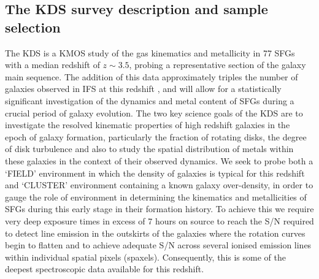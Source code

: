 \documentclass[fleqn,usenatbib]{mn2e}
\begin{document}
\subsection{The KDS survey description and sample selection}\label{subsec:survey_intro}
The KDS is a KMOS study of the gas kinematics and metallicity in 77 SFGs with a median redshift of $z\sim3.5$, probing a representative section of the galaxy main sequence.
The addition of this data approximately triples the number of galaxies observed in IFS at this redshift \citep{Cresci2010,Lemoine-Busserolle2010,Gnerucci2011}, and will allow for a statistically significant investigation of the dynamics and metal content of SFGs during a crucial period of galaxy evolution. 
The two key science goals of the KDS are to investigate the resolved kinematic properties of high redshift galaxies in the epoch of galaxy formation, particularly the fraction of rotating disks, the degree of disk turbulence and also to study the spatial distribution of metals within these galaxies in the context of their observed dynamics.
We seek to probe both a `FIELD' environment in which the density of galaxies is typical for this redshift and `CLUSTER' environment containing a known galaxy over-density, in order to gauge the role of environment in determining the kinematics and metallicities of SFGs during this early stage in their formation history.
To achieve this we require very deep exposure times in excess of 7 hours on source to reach the S/N required to detect line emission in the outskirts of the galaxies where the rotation curves begin to flatten and to achieve adequate S/N across several ionised emission lines within individual spatial pixels (spaxels).
Consequently, this is some of the deepest spectroscopic data available for this redshift. 
\end{document}
